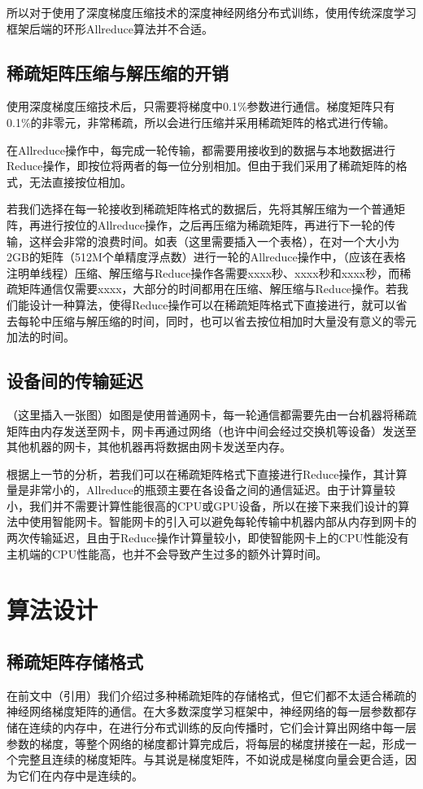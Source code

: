   所以对于使用了深度梯度压缩技术的深度神经网络分布式训练，使用传统深度学习框架后端的环形Allreduce算法并不合适。

\subsection{稀疏矩阵压缩与解压缩的开销}
使用深度梯度压缩技术后，只需要将梯度中0.1\%参数进行通信。梯度矩阵只有0.1\%的非零元，非常稀疏，所以会进行压缩并采用稀疏矩阵的格式进行传输。

在Allreduce操作中，每完成一轮传输，都需要用接收到的数据与本地数据进行Reduce操作，即按位将两者的每一位分别相加。但由于我们采用了稀疏矩阵的格式，无法直接按位相加。

若我们选择在每一轮接收到稀疏矩阵格式的数据后，先将其解压缩为一个普通矩阵，再进行按位的Allreduce操作，之后再压缩为稀疏矩阵，再进行下一轮的传输，这样会非常的浪费时间。如表（这里需要插入一个表格），在对一个大小为2GB的矩阵（512M个单精度浮点数）进行一轮的Allreduce操作中，（应该在表格注明单线程）压缩、解压缩与Reduce操作各需要xxxx秒、xxxx秒和xxxx秒，而稀疏矩阵通信仅需要xxxx，大部分的时间都用在压缩、解压缩与Reduce操作。若我们能设计一种算法，使得Reduce操作可以在稀疏矩阵格式下直接进行，就可以省去每轮中压缩与解压缩的时间，同时，也可以省去按位相加时大量没有意义的零元加法的时间。

\subsection{设备间的传输延迟}
（这里插入一张图）如图是使用普通网卡，每一轮通信都需要先由一台机器将稀疏矩阵由内存发送至网卡，网卡再通过网络（也许中间会经过交换机等设备）发送至其他机器的网卡，其他机器再将数据由网卡发送至内存。

根据上一节的分析，若我们可以在稀疏矩阵格式下直接进行Reduce操作，其计算量是非常小的，Allreduce的瓶颈主要在各设备之间的通信延迟。由于计算量较小，我们并不需要计算性能很高的CPU或GPU设备，所以在接下来我们设计的算法中使用智能网卡。智能网卡的引入可以避免每轮传输中机器内部从内存到网卡的两次传输延迟，且由于Reduce操作计算量较小，即使智能网卡上的CPU性能没有主机端的CPU性能高，也并不会导致产生过多的额外计算时间。

\section{算法设计}
\subsection{稀疏矩阵存储格式}
在前文中（引用）我们介绍过多种稀疏矩阵的存储格式，但它们都不太适合稀疏的神经网络梯度矩阵的通信。在大多数深度学习框架中，神经网络的每一层参数都存储在连续的内存中，在进行分布式训练的反向传播时，它们会计算出网络中每一层参数的梯度，等整个网络的梯度都计算完成后，将每层的梯度拼接在一起，形成一个完整且连续的梯度矩阵。与其说是梯度矩阵，不如说成是梯度向量会更合适，因为它们在内存中是连续的。

